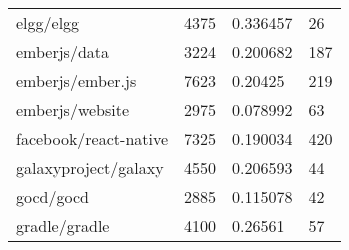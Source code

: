 \begin{table}[]
\begin{tabular}{llll}
elgg/elgg                                   & 4375                               & 0.336457                                                                                                          & 26                                                                                                            \\
emberjs/data                                & 3224                               & 0.200682                                                                                                          & 187                                                                                                           \\
emberjs/ember.js                            & 7623                               & 0.20425                                                                                                           & 219                                                                                                           \\
emberjs/website                             & 2975                               & 0.078992                                                                                                          & 63                                                                                                            \\
facebook/react-native                       & 7325                               & 0.190034                                                                                                          & 420                                                                                                           \\
galaxyproject/galaxy                        & 4550                               & 0.206593                                                                                                          & 44                                                                                                            \\
gocd/gocd                                   & 2885                               & 0.115078                                                                                                          & 42                                                                                                            \\
gradle/gradle                               & 4100                               & 0.26561                                                                                                           & 57                                                                                                            \\

\end{tabular}
\end{table}
